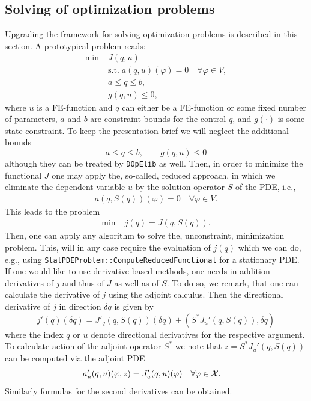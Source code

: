 \documentclass[prodmode,acmtoms]{acmsmall}
\numberwithin{equation}{section}
\renewcommand{\phi}{\varphi}
\newcommand{\dope}{\texttt{DOpElib}}
\begin{document}
\subsection{Solving of optimization problems}\label{sec:opt}
Upgrading the framework for solving optimization problems
is described in this section. A prototypical problem reads:
\begin{align*}
\min\;&J(q,u) \\
  &\text{s.t.}\; a(q,u)(\phi) = 0 \quad \forall \phi\in V,\\
  &a \le q \le b,\\
  &g(q,u) \le 0,  
\end{align*}
where $u$ is a FE-function and $q$ can either be a FE-function or some 
fixed number of parameters, $a$ and $b$ are constraint bounds for the control $q$,
and $g(\cdot)$ is some state constraint.
To keep the presentation brief we will neglect the additional bounds
\[
a \le q \le b,\qquad g(q,u) \le 0
\]
although they can be treated by \dope{} as well.
Then, in order to minimize the functional $J$ one may apply the, so-called, 
reduced approach, in which we eliminate the dependent variable $u$ by the solution 
operator $S$ of the PDE, i.e., 
\begin{align*}
a(q,S(q))(\phi) = 0 \quad \forall \phi\in V. 
\end{align*}
This leads to the problem
\begin{align*}
\min\;&j(q) = J(q,S(q)). 
\end{align*}
Then, one can apply any algorithm to solve the, unconstraint, minimization 
problem. This, will in any case require the evaluation of $j(q)$ which 
we can do, e.g., using \texttt{StatPDEProblem::ComputeReducedFunctional} for 
a stationary PDE. If one would like to use derivative based methods, one 
needs in addition derivatives of $j$ and thus of $J$ as well as of $S$. 
To do so, we remark, that one can calculate the derivative of 
$j$ using the adjoint calculus. Then the directional derivative 
of $j$ in direction $\delta q$ is given by
\[
j'(q)(\delta q) = J'_q(q,S(q))(\delta q) + (S^* J_u'(q,S(q)),\delta q)
\]
where the index $q$ or $u$ denote directional derivatives for the 
respective argument. To calculate action of the adjoint operator $S^*$ 
we note that $z =  S^* J_u'(q,S(q))$
can be computed via the adjoint PDE
\begin{equation}
  \label{opt_KKT_system}
  \begin{aligned}
    a_{u}'(q,u)(\phi , z) &= J'_{u}(q,u)(\phi) & \forall \phi&\in {\cal X}.
  \end{aligned}
\end{equation}
Similarly formulas for the second derivatives can be obtained.
\end{document}
